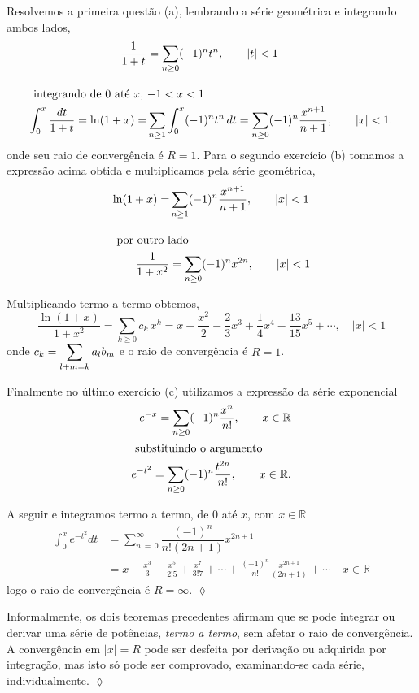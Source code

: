 \solo Resolvemos a primeira questão (a), lembrando a série geométrica
e integrando ambos lados,
\begin{align*}
    \frac{1}{1+t}&=\sum_{n\ge 0}(-1)^nt^n,\qquad |t|<1\\[2ex]
    \intertext{ integrando de \(0\) até \(x\), \(-1 <x <1\) }
    \int_{0}^{x}\dfrac{dt}{1+t}=\ln(1+x)=&\sum_{n\ge 1}\int_0^x(-1)^nt^n\,dt=\sum_{n\ge
    0}(-1)^n\frac{x^{n+1}}{n+1},\qquad |x|<1.
\end{align*}
onde seu raio de convergência é $R=1$. Para o segundo exercício (b)
tomamos a expressão acima obtida e multiplicamos pela série
geométrica,
\begin{align*}
\ln(1+x)=&\sum_{n\ge
    1}(-1)^n\frac{x^{n+1}}{n+1},\qquad |x|<1\\[2ex]
    \intertext{ por outro lado }
\frac{1}{1+x^2}&=\sum_{n\ge 0}(-1)^nx^{2n},\qquad |x|<1
\end{align*}

Multiplicando termo a termo obtemos,
\begin{equation*}
    \frac{\ln(1+x)}{1+x^2}=\sum_{k\ge
    0}c_k\,x^k=x-\frac{x^2}{2}-\frac{2}{3}x^3+\frac{1}{4}x^4-\frac{13}{15}x^5+\cdots,\quad
    |x|<1
\end{equation*}
onde $\displaystyle{c_k=\sum_{l+m=k}a_lb_m}$ e o raio de convergência é
$R=1$. 

Finalmente no último exercício  (c) utilizamos a expressão da
série exponencial 
\begin{align*}
    e^{-x}=\sum_{n\ge 0}(-1)^n\frac{x^n}{n!},\qquad x\in
    \mathbb{R}\\
    \intertext{ substituindo o argumento }
e^{-t^2}=\sum_{n\ge 0}(-1)^n\frac{t^{2n}}{n!},\qquad x\in
\mathbb{R}.
\end{align*}

A seguir e integramos termo a termo, de \(0\) até \(x\), com \(x \in \mathbb{R}\)
\begin{align*}
    \int_0^xe^{-t^2}dt &= \sum_{n\, =\, 0}^{\infty}\dfrac{(-1)^{n}}{n!(2n+1)}x^{2n+1}\\[2ex]
    & =x-\frac{x^3}{3}+\frac{x^5}{2!5}+\frac{x^7}{3!7}+
    \cdots+\frac{(-1)^n}{n!}\frac{x^{2n+1}}{(2n+1)}+\cdots\quad
    x\in \mathbb{R}
\end{align*}
logo o raio de convergência é $R=\infty$. \hfill \(\lozenge\)

Informalmente, os dois teoremas precedentes afirmam que se pode integrar ou derivar uma série de potências, \textit{termo a termo}, sem afetar o raio de convergência. A convergência em $|x| = R$ pode ser desfeita por derivação ou adquirida por integração, mas isto só pode ser comprovado, examinando-se cada série, individualmente. \hfill \(\lozenge\)

